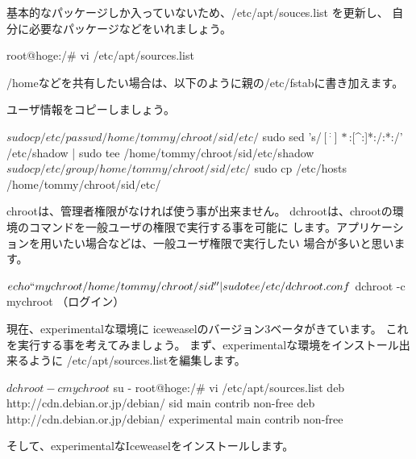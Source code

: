 \documentclass[mingoth,a4paper]{jsarticle}
\begin{document}
基本的なパッケージしか入っていないため、/etc/apt/souces.list を更新し、
自分に必要なパッケージなどをいれましょう。

\begin{commandline}
root@hoge:/# vi /etc/apt/sources.list
\end{commandline}

/homeなどを共有したい場合は、以下のように親の/etc/fstabに書き加えます。


ユーザ情報をコピーしましょう。

\begin{commandline}
 $ sudo cp /etc/passwd /home/tommy/chroot/sid/etc/
 $ sudo sed 's/\([^:]*\):[^:]*:/\1:*:/' /etc/shadow | sudo tee /home/tommy/chroot/sid/etc/shadow
 $ sudo cp /etc/group /home/tommy/chroot/sid/etc/
 $ sudo cp /etc/hosts /home/tommy/chroot/sid/etc/
\end{commandline}

chrootは、管理者権限がなければ使う事が出来ません。
dchrootは、chrootの環境のコマンドを一般ユーザの権限で実行する事を可能に
します。アプリケーションを用いたい場合などは、一般ユーザ権限で実行したい
場合が多いと思います。

\begin{commandline}
 $ echo ``mychroot /home/tommy/chroot/sid'' | sudo tee /etc/dchroot.conf
 $ dchroot -c mychroot （ログイン）
\end{commandline}

現在、experimentalな環境に iceweaselのバージョン3ベータがきています。
これを実行する事を考えてみましょう。
まず、experimentalな環境をインストール出来るように
/etc/apt/sources.listを編集します。

\begin{commandline}
 $ dchroot -c mychroot
 $ su -
root@hoge:/# vi /etc/apt/sources.list
deb http://cdn.debian.or.jp/debian/ sid main contrib non-free
deb http://cdn.debian.or.jp/debian/ experimental main contrib non-free
\end{commandline}

そして、experimentalなIceweaselをインストールします。
\end{document}
